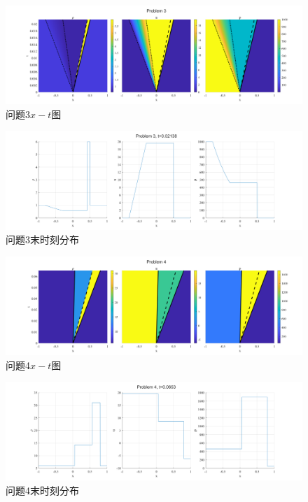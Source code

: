 \documentclass[UTF8,zihao=5]{ctexart} %
\begin{document}
\begin{figure}[H]
    \centering
    \includegraphics[width=18cm]{p3.png}  %
    \caption{问题3$x-t$图}
    \label{fig:3a}
\end{figure}

\begin{figure}[H]
    \centering
    \includegraphics[width=18cm]{p3_l.png}  %
    \caption{问题3末时刻分布}
    \label{fig:3b}
\end{figure}

\begin{figure}[H]
    \centering
    \includegraphics[width=18cm]{p4.png}  %
    \caption{问题4$x-t$图}
    \label{fig:4a}
\end{figure}

\begin{figure}[H]
    \centering
    \includegraphics[width=18cm]{p4_l.png}  %
    \caption{问题4末时刻分布}
    \label{fig:4b}
\end{figure}
\end{document}
